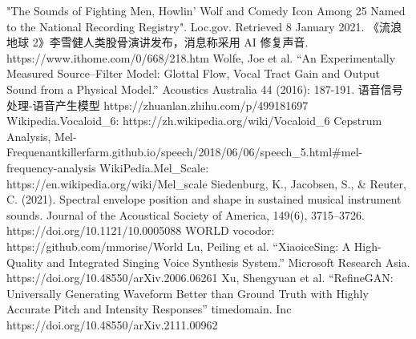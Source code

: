 \documentclass[12pt,a4paper]{ctexart}
\begin{document}
\begin{thebibliography}{99}
    \setlength{\parskip}{0pt}

     "The Sounds of Fighting Men, Howlin' Wolf and Comedy Icon Among 25 Named to the National Recording Registry". Loc.gov. Retrieved 8 January 2021.
     《流浪地球 2》李雪健人类股骨演讲发布，消息称采用 AI 修复声音.
    https://www.ithome.com/0/668/218.htm
     Wolfe, Joe et al. “An Experimentally Measured Source–Filter Model: Glottal Flow, Vocal Tract Gain and Output Sound from a Physical Model.” Acoustics Australia 44 (2016): 187-191.
     语音信号处理-语音产生模型 https://zhuanlan.zhihu.com/p/499181697
     Wikipedia.Vocaloid\_6: https://zh.wikipedia.org/wiki/Vocaloid\_6
     Cepstrum Analysis, Mel-Frequenantkillerfarm.github.io/speech/2018/06/06/speech\_5.html\#mel-frequency-analysis
     WikiPedia.Mel\_Scale: https://en.wikipedia.org/wiki/Mel\_scale
     Siedenburg, K., Jacobsen, S., \& Reuter, C. (2021). Spectral envelope position and shape in sustained musical instrument sounds. Journal of the Acoustical Society of America, 149(6), 3715–3726. https://doi.org/10.1121/10.0005088
     WORLD vocodor: https://github.com/mmorise/World
     Lu, Peiling et al. “XiaoiceSing: A High-Quality and Integrated Singing Voice Synthesis System.” Microsoft Research Asia. https://doi.org/10.48550/arXiv.2006.06261
     Xu, Shengyuan et al. “RefineGAN: Universally Generating Waveform Better than Ground Truth
    with Highly Accurate Pitch and Intensity Responses” timedomain. Inc https://doi.org/10.48550/arXiv.2111.00962





\end{thebibliography}
\end{document}
